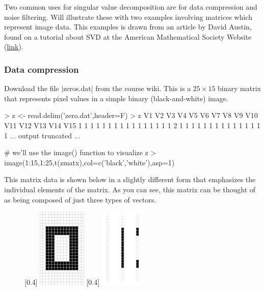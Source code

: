 \documentclass[11pt,letterpaper]{article}
\begin{document}
Two common uses for singular value decomposition are for data compression and noise filtering. Will illustrate these with two examples involving matrices which represent image data. This examples is drawn from an article by David Austin, found on a tutorial about SVD at the American Mathematical Society Website (\href{http://www.ams.org/samplings/feature-column/fcarc-svd}{link}).

\subsubsection*{Data compression}

Download the file |zeros.dat| from the course wiki. This is a $25 \times 15$ binary matrix that represents pixel values in a simple binary (black-and-white) image.

\begin{Rcode}
> z <- read.delim('zero.dat',header=F)
> z
   V1 V2 V3 V4 V5 V6 V7 V8 V9 V10 V11 V12 V13 V14 V15
1   1  1  1  1  1  1  1  1  1   1   1   1   1   1   1
2   1  1  1  1  1  1  1  1  1   1   1   1   1   1   1
... output truncated ...

# we'll use the image() function to visualize z
> image(1:15,1:25,t(zmatx),col=c('black','white'),asp=1)    
\end{Rcode}

This matrix data is shown below in a slightly different form that emphasizes the individual elements of the matrix.  As you can see, this matrix can be thought of as being composed of just three types of vectors.


\begin{figure}[ht!]
\begin{center}
[0.4\linewidth]{%
\includegraphics[height=1.5in]{zero.jpg}%
}
[0.4\linewidth]{%
\includegraphics[height=1.5in]{zero-vecs.jpg}%
}
\end{center}
\end{figure}
\end{document}

